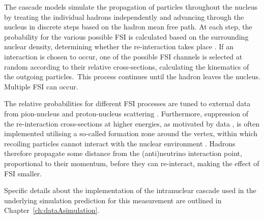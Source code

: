 The cascade models simulate the propagation of particles throughout the nucleus by treating the individual hadrons independently and advancing through the nucleus in discrete steps based on the hadron mean free path. At each step, the probability for the various possible FSI is calculated based on the surrounding nuclear density, determining whether the re-interaction takes place \cite{SALCEDO1988557}. If an interaction is chosen to occur, one of the possible FSI channels is selected at random according to their relative cross-sections, calculating the kinematics of the outgoing particles.~This process continues until the hadron leaves the nucleus. Multiple FSI can occur.

The relative probabilities for different FSI processes are tuned to external data from pion-nucleus and proton-nucleus scattering \cite{Ma_2017, genie_ANDREOPOULOS201087,genie_andreopoulos2015}. Furthermore, suppression of the re-interaction cross-sections at higher energies, as motivated by data \cite{BRODSKY1988685}, is often implemented utilising a so-called formation zone around the vertex, within which recoiling particles cannot interact with the nuclear environment \cite{PhysRevD.104.053006}. Hadrons therefore propagate some distance from the (anti)neutrino interaction point, proportional to their momentum, before they can re-interact, making the effect of FSI smaller.


Specific details about the implementation of the intranuclear cascade used in the underlying simulation prediction for this measurement are outlined in Chapter~\ref{ch:dataAsimulation}.
